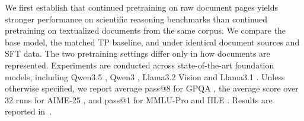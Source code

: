 We first establish that continued pretraining on raw document pages yields stronger performance on scientific
reasoning benchmarks than continued pretraining on textualized documents from the same corpus. 
We compare the base model, the matched TP baseline, and \methodname under identical document sources and SFT data. 
The two pretraining settings differ only in how documents are represented.
Experiments are conducted across state-of-the-art foundation models, including Qwen3.5 \citep{qwen3.5}, Qwen3 \citep{yang2025qwen3}, Llama3.2 Vision \citep{meta2024llama32vision} and Llama3.1 \citep{grattafiori2024llama}.
Unless otherwise specified, we report average pass@8 for GPQA \citep{rein2023gpqa}, 
the average score over 32 runs for AIME-25 \citep{AIME2025}, 
and pass@1 for MMLU-Pro \citep{wang2024mmlu} and HLE \citep{phan2025humanity}. 
Results are reported in~.


